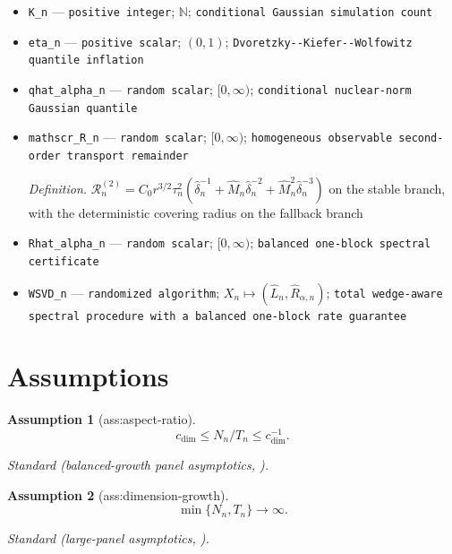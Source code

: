 \documentclass{article}
\newtheorem{assumption}{Assumption}
\begin{document}
\begin{itemize}
  \item \texttt{K\_\allowbreak{}n} --- \texttt{positive integer}; \(\mathbb N\); \texttt{conditional Gaussian simulation count}
  \item \texttt{eta\_\allowbreak{}n} --- \texttt{positive scalar}; \((0,1)\); \texttt{Dvoretzky-\allowbreak{}-\allowbreak{}Kiefer-\allowbreak{}-\allowbreak{}Wolfowitz quantile inflation}
  \item \texttt{qhat\_\allowbreak{}alpha\_\allowbreak{}n} --- \texttt{random scalar}; \([0,\infty)\); \texttt{conditional nuclear-\allowbreak{}norm Gaussian quantile}
  \item \texttt{mathscr\_\allowbreak{}R\_\allowbreak{}n} --- \texttt{random scalar}; \([0,\infty)\); \texttt{homogeneous observable second-\allowbreak{}order transport remainder}
  \par\smallskip\noindent\emph{Definition.} \(\mathscr R_n^{(2)}=C_0r^{3/2}\tau_n^2(\widehat\delta_n^{-1}+\widehat M_n\widehat\delta_n^{-2}+\widehat M_n^2\widehat\delta_n^{-3})\) on the stable branch, with the deterministic covering radius on the fallback branch
  \item \texttt{Rhat\_\allowbreak{}alpha\_\allowbreak{}n} --- \texttt{random scalar}; \([0,\infty)\); \texttt{balanced one-\allowbreak{}block spectral certificate}
  \item \texttt{WSVD\_\allowbreak{}n} --- \texttt{randomized algorithm}; \(X_n\mapsto(\widehat L_n,\widehat R_{\alpha,n})\); \texttt{total wedge-\allowbreak{}aware spectral procedure with a balanced one-\allowbreak{}block rate guarantee}
\end{itemize}

\section{Assumptions}

\begin{assumption}[ass:aspect-ratio]\label{ass:aspect-ratio}
\[c_{\mathrm{dim}}\le N_n/T_n\le c_{\mathrm{dim}}^{-1}.\]
\par\smallskip\noindent\emph{Standard} (balanced-growth panel asymptotics, \cite{BaiNg2021}).
\end{assumption}

\begin{assumption}[ass:dimension-growth]\label{ass:dimension-growth}
\[\min\{N_n,T_n\}\longrightarrow\infty.\]
\par\smallskip\noindent\emph{Standard} (large-panel asymptotics, \cite{BaiNg2021}).
\end{assumption}
\end{document}
